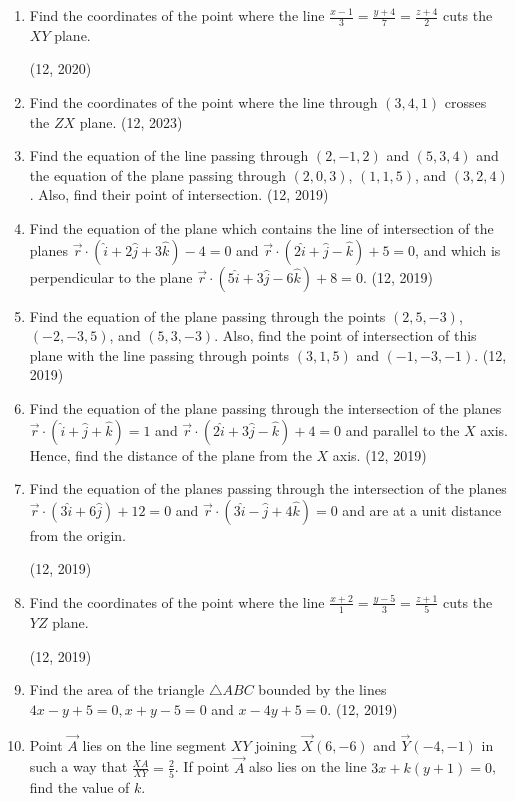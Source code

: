 \begin{enumerate}[label=\thesubsection.\arabic*, ref=\thesubsection.\theenumi]
\item Find the coordinates of the point where the line $\frac{x-1}{3} = \frac{y+4}{7} = \frac{z+4}{2}$ cuts the $XY$ plane.

\hfill (12, 2020)
    \item Find the coordinates of the point where the line through $(3, 4, 1)$ crosses the $ZX$ plane.
    \hfill (12, 2023)
	\item Find the equation of the line passing through $(2, -1, 2)$ and $(5, 3, 4)$ and the equation of the plane passing through $(2, 0, 3)$, $(1, 1, 5)$, and $(3, 2, 4)$. Also, find their point of intersection. \hfill (12, 2019)
	
	\item Find the equation of the plane which contains the line of intersection of the planes $\overrightarrow{r} \cdot (\hat{i} + 2\hat{j} + 3\hat{k}) - 4 = 0$ and $\overrightarrow{r} \cdot (2\hat{i} + \hat{j} - \hat{k}) + 5 = 0$, and which is perpendicular to the plane $\overrightarrow{r} \cdot (5\hat{i} + 3\hat{j} - 6\hat{k}) + 8 = 0$. \hfill (12, 2019)
	\item Find the equation of the plane passing through the points $(2, 5, -3)$, $(-2, -3, 5)$, and $(5, 3, -3)$. Also, find the point of intersection of this plane with the line passing through points $(3, 1, 5)$ and $(-1, -3, -1)$. \hfill (12, 2019)
	\item Find the equation of the plane passing through the intersection of the planes $\overrightarrow{r} \cdot (\hat{i} + \hat{j} + \hat{k}) = 1$ and $\overrightarrow{r} \cdot (2\hat{i} + 3\hat{j} - \hat{k}) + 4 = 0$ and parallel to the $X$ axis. Hence, find the distance of the plane from the $X$ axis. \hfill (12, 2019)
	\item Find the equation of the planes passing through the intersection of the planes $\overrightarrow{r} \cdot (3\hat{i} + 6\hat{j}) + 12 = 0$ and $\overrightarrow{r} \cdot (3\hat{i} - \hat{j} + 4\hat{k}) = 0$ and are at a unit distance from the origin.

		\hfill (12, 2019)
	\item Find the coordinates of the point where the line $\frac{x+2}{1} = \frac{y-5}{3} = \frac{z+1}{5}$ cuts the $YZ$ plane.

		\hfill (12, 2019)
	\item Find the area of the triangle $\triangle ABC$ bounded by the lines
	$4x - y + 5 = 0, 
	x + y - 5 = 0$ and 
	$x - 4y + 5 = 0$.
 \hfill (12, 2019)
\item Point $\vec{A}$ lies on the line segment $XY$ joining $\vec{X}(6, -6)$ and $\vec{Y}(-4, -1)$ in such a way that $\frac{XA}{XY} = \frac{2}{5}$. If point $\vec{A}$ also lies on the line $3x + k(y + 1) = 0$, find the value of $k$.


\end{enumerate}
